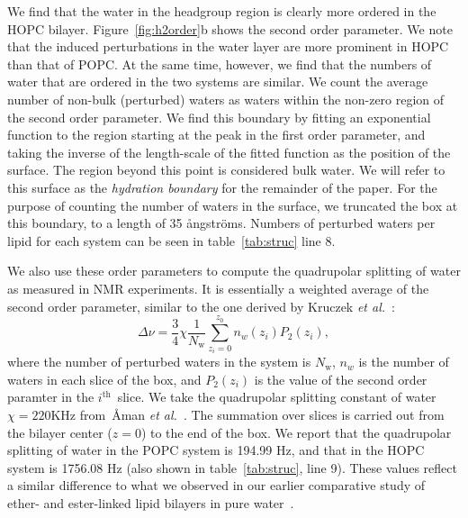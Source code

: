 \documentclass[12pt,openany,final]{book}
\newcommand{\etal}{\textit{et al.}}
\newcommand{\aangstroms}{{\aa}ngstr{\"o}ms}
\begin{document}
We find that the water in the headgroup region is clearly more ordered in the HOPC bilayer.  
Figure~\ref{fig:h2order}b shows the second order parameter. We note that the induced perturbations in the water layer are more prominent in HOPC than that of POPC.
At the same time, however, we find that the numbers of water that are ordered in the two systems are similar.
We count the average number of non-bulk (perturbed) waters as waters within the non-zero region of the second order parameter. 
We find this boundary by fitting an exponential function to the region starting at the peak in
the first order parameter, and taking the inverse of the length-scale of the fitted function as the position of the surface.
The region beyond this point is considered bulk water. We will refer to this surface as the \emph{hydration boundary} for the remainder of the paper.
For the purpose of counting the number of waters in the surface, we truncated the box at this boundary, to a length of 35 \aangstroms. 
Numbers of perturbed waters per lipid for each system can be seen in table~\ref{tab:struc} line 8.

We also use these order parameters to compute the quadrupolar splitting of water as measured in NMR experiments. 
It is essentially a weighted average of the second order parameter, similar to the one derived by Kruczek \etal~\cite{kruczek:2017:ether}: %
\begin{equation}
\label{eq:deltanu}
\Delta \nu = \frac{3}{4} \chi \frac{1}{N_{\text{w}}}\sum^{z_0}_{z_i=0}n_{w}(z_i)P_2(z_i),
\end{equation}
where the number of perturbed waters in the system is $N_\text{w}$, $n_{w}$ is the number of waters in each slice of the box,
and $P_2(z_i)$ is the value of the second order paramter in the $i^{\text{th}}$~slice. We take the quadrupolar splitting constant of water $\chi=220 \text{KHz}$ 
from~{\AA}man \etal~\cite{aaman:2003}. 
The summation over slices is carried out from the bilayer center ($z=0$) to 
the end of the box. 
We report that the quadrupolar splitting of water in the POPC system is 194.99 Hz, and that in the HOPC system is 1756.08 Hz (also shown in table~\ref{tab:struc}, line 9). 
These values reflect a similar difference to what we observed in our earlier comparative study of ether- and ester-linked lipid bilayers in pure water~\cite{kruczek:2017:ether}.
\end{document}
